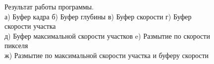 \begin{figure}[h]
    \caption{Результат работы программы. \\ а) Буфер кадра б) Буфер глубины в) Буфер скорости г) Буфер скорости участка \\ д) Буфер максимальной скорости участков  e) Размытие по скорости пикселя \\ ж) Размытие по максимальной скорости участка и буферу скорости  }
    \label{fig:result_buffers}
\end{figure} 











